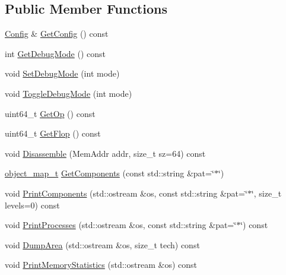 \subsection*{Public Member Functions}
\begin{DoxyCompactItemize}
\item 
\hyperlink{class_config}{Config} \& \hyperlink{class_simulator_1_1_m_g_system_aea36c14f94f755b42017a109856be4f5}{Get\+Config} () const 
\item 
int \hyperlink{class_simulator_1_1_m_g_system_ad6fa1e1f162df20be24e546fb25b80f8}{Get\+Debug\+Mode} () const 
\item 
void \hyperlink{class_simulator_1_1_m_g_system_acfe54d4c871865a4ddfaa857a6ca9bb3}{Set\+Debug\+Mode} (int mode)
\item 
void \hyperlink{class_simulator_1_1_m_g_system_acf2d385933a262004c030f86cd3020ac}{Toggle\+Debug\+Mode} (int mode)
\item 
uint64\+\_\+t \hyperlink{class_simulator_1_1_m_g_system_aff1496e896efdac9bca1328e35e47685}{Get\+Op} () const 
\item 
uint64\+\_\+t \hyperlink{class_simulator_1_1_m_g_system_a8e264226f2c197bffa2c7e504f861db4}{Get\+Flop} () const 
\item 
void \hyperlink{class_simulator_1_1_m_g_system_a7bfbc3bb9278d876f45a141cbeb438f2}{Disassemble} (Mem\+Addr addr, size\+\_\+t sz=64) const 
\item 
\hyperlink{class_simulator_1_1_m_g_system_ae7bb90912b7e1348ab3ddefa4e8bc431}{object\+\_\+map\+\_\+t} \hyperlink{class_simulator_1_1_m_g_system_aa871dffcaaca19cac5c80f9523a96cae}{Get\+Components} (const std\+::string \&pat=\char`\"{}$\ast$\char`\"{})
\item 
void \hyperlink{class_simulator_1_1_m_g_system_a09db598cea8d6fadb9f20104f455e7a0}{Print\+Components} (std\+::ostream \&os, const std\+::string \&pat=\char`\"{}$\ast$\char`\"{}, size\+\_\+t levels=0) const 
\item 
void \hyperlink{class_simulator_1_1_m_g_system_a9937459418531c9c90b581ee986bb38f}{Print\+Processes} (std\+::ostream \&os, const std\+::string \&pat=\char`\"{}$\ast$\char`\"{}) const 
\item 
void \hyperlink{class_simulator_1_1_m_g_system_aa323f6da24b64c857dc934b6f79e8ef3}{Dump\+Area} (std\+::ostream \&os, size\+\_\+t tech) const 
\item 
void \hyperlink{class_simulator_1_1_m_g_system_ad711cea3becfd24227b5e867e56730de}{Print\+Memory\+Statistics} (std\+::ostream \&os) const 
\item 

\end{DoxyCompactItemize}
